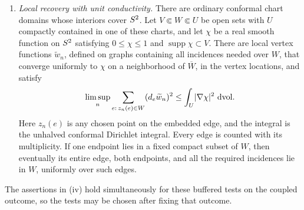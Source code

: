 \begin{proposition}
\begin{enumerate}[label=\textup{(\roman*)}]
\item \emph{Local recovery with unit conductivity.}  There are ordinary
conformal chart domains whose interiors cover \(S^2\).  Let
\(V\Subset W\Subset U\) be open sets with \(U\) compactly contained
in one of these charts, and let \(\chi\) be a real smooth function on
\(S^2\) satisfying \(0\le\chi\le1\) and
\(\operatorname{supp}\chi\subset V\).  There are local vertex
functions \(\widetilde w_n\), defined on graphs containing all
incidences needed over \(W\), that converge uniformly to \(\chi\) on
a neighborhood of \(\overline W\), in the vertex locations, and satisfy
\begin{equation}\label{eq:local-recovery}
 \limsup_n\sum_{e:\,z_n(e)\in W}
       (d_e\widetilde w_n)^2
 \le\int_U\lvert\nabla\chi\rvert^2\,\,\mathrm d\mathrm{vol}.
\end{equation}
Here \(z_n(e)\) is any chosen point on the embedded edge, and the
integral is the unhalved conformal Dirichlet integral.  Every edge is
counted with its multiplicity.  If one endpoint lies in a fixed compact
subset of \(W\), then eventually its entire edge, both endpoints, and
all the required incidences lie in \(W\), uniformly over such edges.
\end{enumerate}
The assertions in \textup{(iv)} hold simultaneously for these buffered
tests on the coupled outcome, so the tests may be chosen after fixing
that outcome.
\end{proposition}

